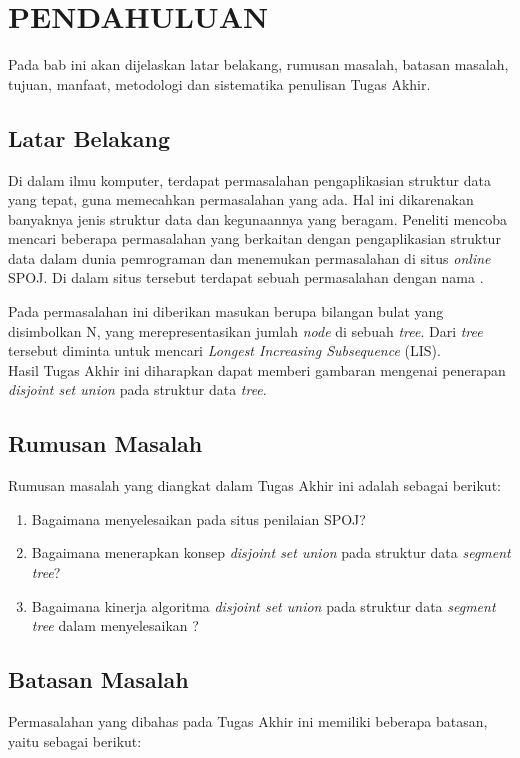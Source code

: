 \chapter{PENDAHULUAN}
Pada bab ini akan dijelaskan latar belakang, rumusan masalah, batasan masalah, tujuan, manfaat, metodologi dan sistematika penulisan Tugas Akhir.

\section{\quad Latar Belakang}
\quad Di dalam ilmu komputer, terdapat permasalahan pengaplikasian struktur data yang tepat, guna memecahkan permasalahan yang ada. Hal ini dikarenakan banyaknya jenis struktur data dan kegunaannya yang beragam. Peneliti mencoba mencari beberapa permasalahan yang berkaitan dengan pengaplikasian struktur data dalam dunia pemrograman dan menemukan permasalahan di situs \textit{online} SPOJ. Di dalam situs tersebut terdapat sebuah permasalahan dengan nama \problem\cite{listree}.

\quad Pada permasalahan ini diberikan masukan berupa bilangan bulat yang disimbolkan N, yang merepresentasikan jumlah \textit{node} di sebuah \textit{tree}. Dari \textit{tree} tersebut diminta untuk mencari \textit{Longest Increasing Subsequence} (LIS).\\
Hasil Tugas Akhir ini diharapkan dapat memberi gambaran mengenai penerapan \textit{disjoint set union} pada struktur data \textit{tree}.

\section{\quad Rumusan Masalah}
\quad Rumusan masalah yang diangkat dalam Tugas Akhir ini adalah sebagai berikut:
\begin{enumerate}
	\item Bagaimana menyelesaikan \problem\cite{listree} pada situs penilaian SPOJ?
	\item Bagaimana menerapkan konsep \textit{disjoint set union} pada struktur data \textit{segment tree}?
	\item Bagaimana kinerja algoritma \textit{disjoint set union} pada struktur data \textit{segment tree} dalam menyelesaikan \problem\cite{listree}?
\end{enumerate}

\section{\quad Batasan Masalah}
\quad Permasalahan yang dibahas pada Tugas Akhir ini memiliki beberapa batasan, yaitu sebagai berikut:

